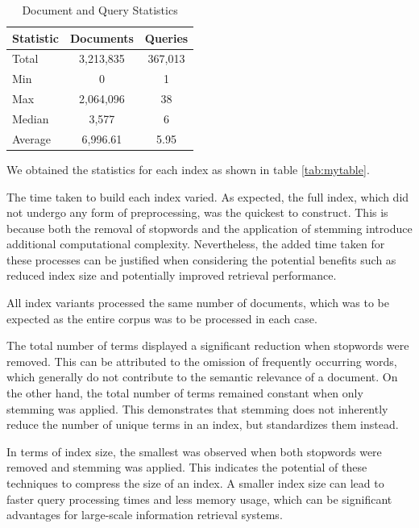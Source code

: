 \documentclass[11pt,a4paper]{article}
\begin{document}
\begin{table}[htbp]
    \centering
    \caption{Document and Query Statistics}
    \label{tab:statistics}
    \begin{tabular}{lcc}
        \toprule
        \multicolumn{1}{c}{\textbf{Statistic}} & \multicolumn{1}{c}{\textbf{Documents}} & \multicolumn{1}{c}{\textbf{Queries}} \\
        \midrule
        Total   & 3,213,835 & 367,013 \\
        Min     & 0         & 1 \\
        Max     & 2,064,096 & 38 \\
        Median  & 3,577     & 6 \\
        Average & 6,996.61  & 5.95 \\
        \bottomrule
    \end{tabular}
\end{table}


We obtained the statistics for each index as shown in table
\ref{tab:mytable}.

The time taken to build each index varied. As expected, the full
index, which did not undergo any form of preprocessing, was the
quickest to construct. This is because both the removal of stopwords
and the application of stemming introduce additional computational
complexity. Nevertheless, the added time taken for these processes
can be justified when considering the potential benefits such as
reduced index size and potentially improved retrieval performance.

All index variants processed the same number of documents, which was
to be expected as the entire corpus was to be processed in each case.

The total number of terms displayed a significant reduction when
stopwords were removed. This can be attributed to the omission of
frequently occurring words, which generally do not contribute to the
semantic relevance of a document. On the other hand, the total number
of terms remained constant when only stemming was applied. This
demonstrates that stemming does not inherently reduce the number of
unique terms in an index, but standardizes them instead.

In terms of index size, the smallest was observed when both stopwords
were removed and stemming was applied. This indicates the potential
of these techniques to compress the size of an index. A smaller index
size can lead to faster query processing times and less memory usage,
which can be significant advantages for large-scale information
retrieval systems.
\end{document}
